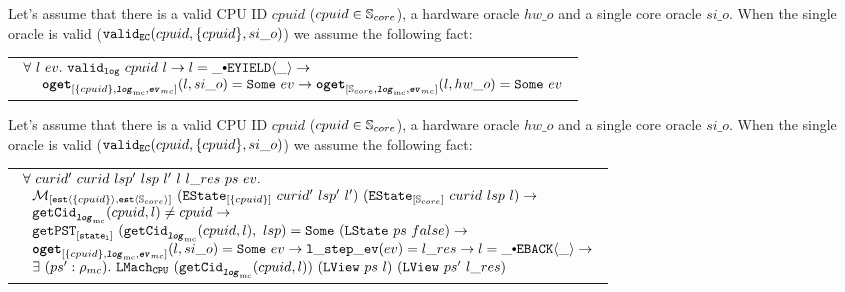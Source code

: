 \begin{hypothesis}
\label{hypothesis:chapter:conlink:related-single-oracle-hw-oracle}
Let's assume that there is a valid CPU ID $cpuid$
($cpuid \in {\mathbb{S}_{core}}$),  a hardware oracle $hw\_o$
and a single core oracle $si\_o$.
When the single oracle is valid ($ {{\mathrm{\texttt{valid}}}_{{\mathrm{\texttt{EC}}}}}({cpuid}, {\{cpuid\}}, {si\_o})$) we assume the following fact:
\begin{center}
\begin{tabular}{P{0.95\textwidth}}
$
\begin{array}{l}
\forall \ l \ ev  . \ \validlog{cpuid}{l} \rightarrow l = \listconsoppo{\yieldev{\_}}{\_} \rightarrow\\
\ \ \ \ \oget{\set{cpuid}}{\mclog}{\mcevent}{l}{si\_o}{ev} \rightarrow \oget{\coreset}{\mclog}{\mcevent}{l}{hw\_o}{ev} \\
\end{array}
$
\end{tabular}
\end{center}
\end{hypothesis}


\begin{hypothesis}
\label{hypothesis:chapter:conlink:related-single-oracle-concrete-step}
Let's assume that there is a valid CPU ID $cpuid$ ($cpuid \in {\mathbb{S}_{core}}$),  a hardware oracle $hw\_o$
and a single core oracle $si\_o$.
When the single oracle is valid ($ {{\mathrm{\texttt{valid}}}_{{\mathrm{\texttt{EC}}}}}({cpuid}, {\{cpuid\}}, {si\_o})$) we assume the following fact:
\begin{center}
\begin{tabular}{P{0.95\textwidth}}
$
\begin{array}{l}
\forall \ curid' \ curid \ lsp' \ lsp \ l' \ l \ l\_res \ ps \ ev . \\
\ \ \matchestateestate{\set{cpuid}}{(\envstate{\set{cpuid}}{curid'}{lsp'}{l'})}{(\envstate{\coreset}{curid}{lsp}{l})} \rightarrow\\
\ \ \getcuridfromlognoeq{cpuid}{l} \neq cpuid \rightarrow \\
\ \ \getpstsome{\localstatekwd}{\getcuridfromlognoeq{cpuid}{l}}{lsp}{(\localstate{ps}{false})} \rightarrow \\
\ \ \oget{\set{cpuid}}{\mclog}{\mcevent}{l}{si\_o}{ev} \rightarrow \localstepev{ev}{l\_res} \rightarrow l = \listconsoppo{\yieldbackev{\_}}{\_} \rightarrow \\
\ \ \exists\ (ps' : \privatestate) . \ \hardwarelocalstep{(\getcuridfromlognoeq{cpuid}{l})}{(\localview{ps}{l})}{(\localview{ps'}{l\_res})} \\
\end{array}
$
\end{tabular}
\end{center}
\end{hypothesis}

